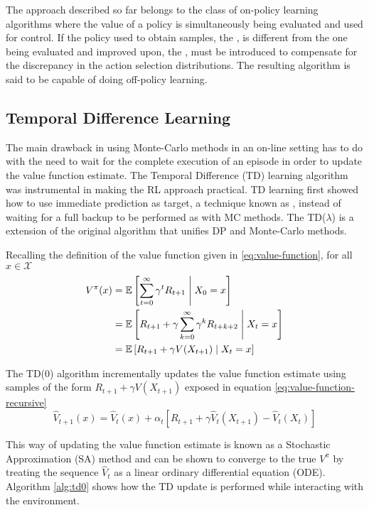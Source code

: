 The approach described so far belongs to the class of on-policy learning algorithms
where the value of a policy is simultaneously being evaluated and used for control.
If the policy used to obtain samples, the , is different from
the one being evaluated and improved upon, the ,
 must be introduced to compensate for the
discrepancy in the action selection distributions. The resulting algorithm is said to
be capable of doing off-policy learning.

\subsection{Temporal Difference Learning}
The main drawback in using Monte-Carlo methods in an on-line setting has to do with
the need to wait for the complete execution of an episode in order to update the value
function estimate. The Temporal Difference (TD) learning algorithm was instrumental in making the RL approach practical. TD learning first showed how to use immediate prediction as target, a technique known as
, instead of waiting for a full backup to be performed as with
MC methods. The TD($\lambda$) is a extension of the original algorithm
\cite{Sutton1984} that unifies DP and Monte-Carlo methods.

Recalling the definition of the value function given in \ref{eq:value-function}, for all $x \in \mathcal{X}$
\begin{align}
V^\pi(x) &= \operatorname{\mathbb{E}} \left[ \sum_{t=0}^\infty \gamma^t R_{t+1}  \;\middle\vert\;  X_0 =
x\right] \notag \\
&= \operatorname{\mathbb{E}} \left[ R_{t+1} + \gamma \sum_{k=0}^\infty \gamma^k
R_{t+k+2}\;\middle\vert\; X_t = x\right]  \notag \\
&= \operatorname{\mathbb{E}} \left[ R_{t+1} + \gamma V(X_{t+1}) \;\middle\vert\; X_t = x\right]
\label{eq:value-function-recursive}
\end{align}

The TD(0) algorithm incrementally updates the value function estimate using samples
of the form $R_{t+1} + \gamma V(X_{t+1})$ exposed in equation 
\ref{eq:value-function-recursive}
\begin{equation}
\hat{V}_{t+1}(x) = \hat{V}_{t}(x) + \alpha_t \left[ R_{t+1} + \gamma \hat{V}_t (X_{t+1})
- \hat{V}_t(X_t)\right] \label{eq:tdupdate}
\end{equation}

This way of updating the value function estimate is known as a Stochastic
Approximation (SA) method and can be shown to converge \cite{Csaba2010} to the
true $V^\pi$ by treating the sequence $\hat{V}_t$ as a linear ordinary differential
equation (ODE). Algorithm \ref{alg:td0} shows how the TD update is performed while
interacting with the environment.

